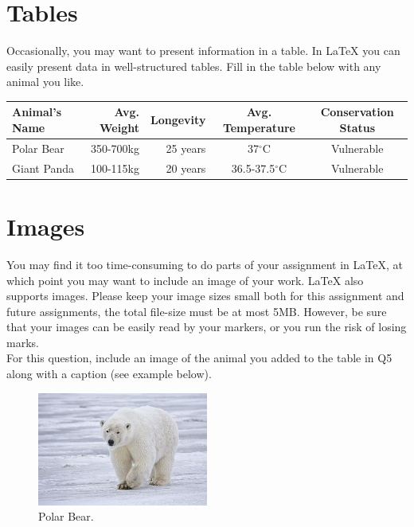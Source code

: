 \documentclass[12pt]{article}
\begin{document}
	\section{Tables}
	Occasionally, you may want to present information in a table. In \LaTeX{} you can easily
	present data in well-structured tables. 
	Fill in the table below with any animal you like.\\
	
	\begin{tabular}{ | l || r  | r | c | c |} \hline
		Animal's Name & Avg. Weight & Longevity & Avg. Temperature & Conservation Status  \\ \hline
		Polar Bear & 350-700kg & 25 years & 37$^{\circ}$C  & Vulnerable \\ \hline
		Giant Panda & 100-115kg & 20 years & 36.5-37.5$^{\circ}$C & Vulnerable \\ \hline
	\end{tabular}
	
	\section{Images}
	\label{sec:image}
	
	You may find it too time-consuming to do parts of your assignment in \LaTeX{}, at which 
	point you may want to include an image of your work. \LaTeX{} also supports images. 
	Please keep your image sizes small both for this assignment and future assignments, the total file-size must be at most 5MB.  However, be sure that your images can be easily read by your markers, or you run the risk of losing marks. \\
	
	For this question, include an image of the animal you added to the table in Q5 along with a caption (see example below).
	
	\begin{figure}[tbhp]
		\begin{center}
			\includegraphics[width=0.5\textwidth]{polar_bear.jpg}
		\end{center}
		\caption{Polar Bear.}
		\label{figcaption}
	\end{figure}
	
\end{document}
